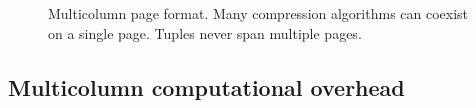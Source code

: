 \documentclass{vldb}
\newcommand{\rows}{Rose\xspace}
\newcommand{\rowss}{Rose's\xspace}
\begin{document}



\begin{figure}
\centering {}
\caption{Multicolumn page format.  Many compression algorithms
can coexist on a single page.  Tuples never span multiple pages.}
\label{fig:mc-fmt}
\end{figure}




\subsection{Multicolumn computational overhead}
\end{document}
